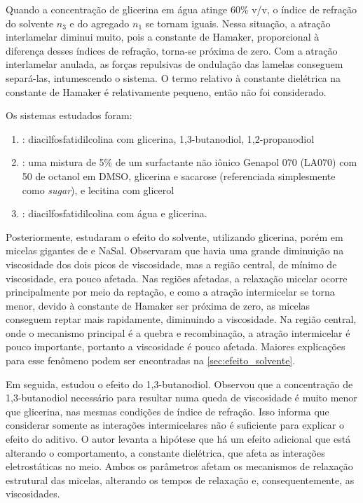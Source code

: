 		Quando a concentração de glicerina em água atinge 60\% v/v, o índice de refração do solvente \(n_3\) e do agregado \(n_1\) se tornam iguais. Nessa situação, a atração interlamelar diminui muito, pois a constante de Hamaker, proporcional à diferença desses índices de refração, torna-se próxima de zero. Com a atração interlamelar anulada, as forças repulsivas de ondulação das lamelas conseguem separá-las, intumescendo o sistema. O termo relativo à constante dielétrica na constante de Hamaker é relativamente pequeno, então não foi considerado.
		
		Os sistemas estudados foram: 
		
		\begin{enumerate}[noitemsep]
			\item \citeauthor{Grabner2014}: diacilfosfatidilcolina com glicerina, 1,3-butanodiol, 1,2-propanodiol
			\item \citeauthor{Song2008a}: uma mistura de 5\% de um surfactante não iônico Genapol 070 (LA070) com 50\mM{} de octanol em DMSO, glicerina e sacarose (referenciada simplesmente como \emph{sugar}), e lecitina com glicerol
			\item \citeauthor{Shinto2012}: diacilfosfatidilcolina com água e glicerina.
		\end{enumerate}
		
		
		
		Posteriormente, \citeauthor{Hoffmann2010} estudaram o efeito do solvente, utilizando glicerina, porém em micelas gigantes de \CTAB{} e NaSal. Observaram que havia uma grande diminuição na viscosidade dos dois picos de viscosidade, mas a região central, de mínimo de viscosidade, era pouco afetada. Nas regiões afetadas, a relaxação micelar ocorre principalmente por meio da reptação, e como a atração intermicelar se torna menor, devido à constante de Hamaker ser próxima de zero, as micelas conseguem reptar mais rapidamente, diminuindo a viscosidade. Na região central, onde o mecanismo principal é a quebra e recombinação, a atração intermicelar é pouco importante, portanto a viscosidade é pouco afetada. Maiores explicações para esse fenômeno podem ser encontradas na \autoref{sec:efeito_solvente}. 
		
		Em seguida, \citeauthor{Abdel-Rahem2014} estudou o efeito do 1,3-butanodiol. Observou que a concentração de 1,3-butanodiol necessário para resultar numa queda de viscosidade é muito menor que glicerina, nas mesmas condições de índice de refração. Isso informa que considerar somente as interações intermicelares não é suficiente para explicar o efeito do aditivo. O autor levanta a hipótese que há um efeito adicional que está alterando o comportamento, a constante dielétrica, que afeta as interações eletrostáticas no meio. Ambos os parâmetros afetam os mecanismos de relaxação estrutural das micelas, alterando os tempos de relaxação e, consequentemente, as viscosidades. 
		

